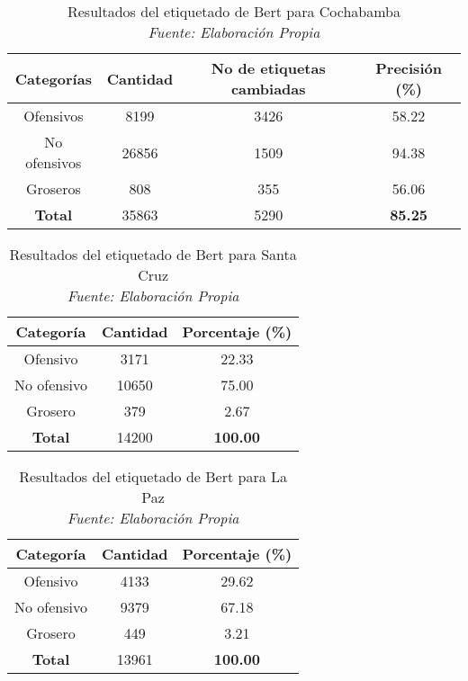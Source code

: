 \begin{itemize}
\begin{table}[!ht]
	\centering
	\begin{tabular}{|c|c|c|c|}
		\hline
		\textbf{Categorías} & \textbf{Cantidad} & \textbf{No de etiquetas cambiadas} & \textbf{Precisión (\%)} \\ \hline
		Ofensivos & 8199 & 3426 & 58.22 \\ 
		No ofensivos & 26856 & 1509 & 94.38 \\ 
		Groseros & 808 & 355 & 56.06 \\ \hline
		\textbf{Total} & 35863 & 5290 & \textbf{85.25} \\ \hline
	\end{tabular}
	\caption{Resultados del etiquetado de Bert para Cochabamba
		\\\textit{Fuente: Elaboración Propia}}
	\label{tbl:cochabamba}
\end{table}

\begin{table}[!ht]
	\centering
	\begin{tabular}{|c|c|c|}
		\hline
		\textbf{Categoría} & \textbf{Cantidad} & \textbf{Porcentaje (\%)} \\ \hline
		Ofensivo & 3171 & 22.33 \\ 
		No ofensivo & 10650 & 75.00 \\ 
		Grosero & 379 & 2.67 \\ \hline
		\textbf{Total} & 14200 & \textbf{100.00} \\ \hline
	\end{tabular}
	\caption{Resultados del etiquetado de Bert para Santa Cruz
		\\\textit{Fuente: Elaboración Propia}}
	\label{tbl:santacruz}
\end{table}


\begin{table}[!ht]
	\centering
	\begin{tabular}{|c|c|c|}
		\hline
		\textbf{Categoría} & \textbf{Cantidad} & \textbf{Porcentaje (\%)} \\ \hline
		Ofensivo & 4133 & 29.62 \\ 
		No ofensivo & 9379 & 67.18 \\ 
		Grosero & 449 & 3.21 \\ \hline
		\textbf{Total} & 13961 & \textbf{100.00} \\ \hline
	\end{tabular}
	\caption{Resultados del etiquetado de Bert para La Paz
		\\\textit{Fuente: Elaboración Propia}}
	\label{tbl:lapaz}
\end{table}


\end{itemize}
